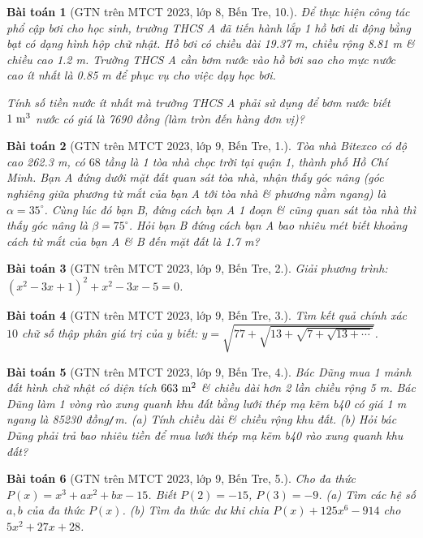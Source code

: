 \documentclass{article}
\newtheorem{baitoan}{Bài toán}
\begin{document}
\begin{baitoan}[GTN trên MTCT 2023, lớp 8, Bến Tre, 10.]
	Để thực hiện công tác phổ cập bơi cho học sinh, trường THCS A đã tiến hành lắp 1 hồ bơi di động bằng bạt có dạng hình hộp chữ nhật. Hồ bơi có chiều dài \emph{19.37 m}, chiều rộng \emph{8.81 m} \& chiều cao \emph{1.2 m}. Trường THCS A cần bơm nước vào hồ bơi sao cho mực nước cao ít nhất là \emph{0.85 m} để phục vụ cho việc dạy học bơi.
	
	Tính số tiền nước ít nhất mà trường THCS A phải sử dụng để bơm nước biết $\rm 1\ m^3$ nước có giá là \emph{7690 đồng} (làm tròn đến hàng đơn vị)?
\end{baitoan}

\begin{baitoan}[GTN trên MTCT 2023, lớp 9, Bến Tre, 1.]
	Tòa nhà Bitexco có độ cao \emph{262.3 m}, có $68$ tầng là 1 tòa nhà chọc trời tại quận 1, thành phố Hồ Chí Minh. Bạn A đứng dưới mặt đất quan sát tòa nhà, nhận thấy góc nâng (góc nghiêng giữa phương từ mắt của bạn A tới tòa nhà \& phương nằm ngang) là $\alpha = 35^\circ$. Cùng lúc đó bạn B, đứng cách bạn A 1 đoạn \& cũng quan sát tòa nhà thì thấy góc nâng là $\beta = 75^\circ$. Hỏi bạn B đứng cách bạn A bao nhiêu mét biết khoảng cách từ mắt của bạn A \& B đến mặt đất là \emph{1.7 m}?
\end{baitoan}

\begin{baitoan}[GTN trên MTCT 2023, lớp 9, Bến Tre, 2.]
	Giải phương trình: $(x^2 - 3x + 1)^2 + x^2 - 3x - 5 = 0$.
\end{baitoan}

\begin{baitoan}[GTN trên MTCT 2023, lớp 9, Bến Tre, 3.]
	Tìm kết quả chính xác $10$ chữ số thập phân giá trị của $y$ biết: $y = \sqrt{77 + \sqrt{13 + \sqrt{7 + \sqrt{13 + \cdots}}}}$.
\end{baitoan}

\begin{baitoan}[GTN trên MTCT 2023, lớp 9, Bến Tre, 4.]
	Bác Dũng mua 1 mảnh đất hình chữ nhật có diện tích $\rm663\ m^2$ \& chiều dài hơn 2 lần chiều rộng \emph{5 m}. Bác Dũng làm 1 vòng rào xung quanh khu đất bằng lưới thép mạ kẽm b40 có giá \emph{1 m} ngang là \emph{85230 đồng\texttt{/}m}. (a) Tính chiều dài \& chiều rộng khu đất. (b) Hỏi bác Dũng phải trả bao nhiêu tiền để mua lưới thép mạ kẽm b40 rào xung quanh khu đất? 
\end{baitoan}

\begin{baitoan}[GTN trên MTCT 2023, lớp 9, Bến Tre, 5.]
	Cho đa thức $P(x) = x^3 + ax^2 + bx - 15$. Biết $P(2) = -15$, $P(3) = -9$. (a) Tìm các hệ số $a,b$ của đa thức $P(x)$. (b) Tìm đa thức dư khi chia $P(x) + 125x^6 - 914$ cho $5x^2 + 27x + 28$.
\end{baitoan}
\end{document}

